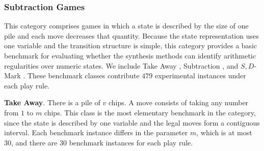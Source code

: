 \documentclass[review]{elsarticle}
\newcommand{\set}[1]{\{ #1 \}}
\newcommand{\tuple}[1]{\langle {#1} \rangle}
\newcommand{\true}{\top}
\newcommand{\statevar}{\mathcal{X}}
\newcommand{\act}{\mathcal{A}}
\newcommand{\constraint}{\mathcal{C}}
\newcommand{\estate}{\mathcal{E}}
\newcommand{\pre}{\mathtt{pre}}
\newcommand{\eff}{\mathtt{eff}}
\begin{document}
{\color{red}\subsubsection{Subtraction Games}}
{\color{red}This category comprises games in which a state is described by the size of one pile and each move decreases that quantity.}
{\color{red}Because the state representation uses one variable and the transition structure is simple, this category provides a basic benchmark for evaluating whether the synthesis methods can identify arithmetic regularities over numeric states.}
{\color{red}We include Take Away \cite{Gol1966}, Subtraction \cite{Yag2001}, and $S,D$-Mark \cite{Sop2016}.}
{\color{red}These benchmark classes contribute $479$ experimental instances under each play rule.}

{\color{red}\textbf{Take Away}. There is a pile of $v$ chips.}
{\color{red}A move consists of taking any number from $1$ to $m$ chips.}
{\color{red}This class is the most elementary benchmark in the category, since the state is described by one variable and the legal moves form a contiguous interval.}
{\color{red}Each benchmark instance differs in the parameter $m$, which is at most $30$, and there are $30$ benchmark instances for each play rule.}
\end{document}
